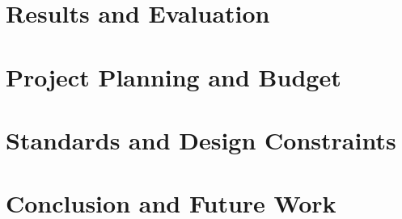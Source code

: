 \documentclass[12pt]{report}
\begin{document}
\chapter{Results and Evaluation} \label{cha:ResultsAndEvaluationU}


\chapter{Project Planning and Budget\label{cha:cost_time}}


\chapter{Standards and Design Constraints} \label{cha:AccreditationComponents}


\chapter{Conclusion and Future Work} \label{cha:ConclusionAndFutureWork}






% 

% 


% 

% 

% 


% 

% 







\appendix 
% 

\end{document}
